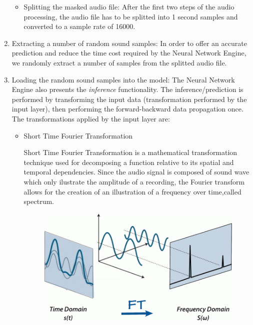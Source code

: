 \begin{enumerate}
\begin{itemize}
			\item Splitting the masked audio file: After the first two steps of the audio processing,
	the audio file has to be splitted into 1 second samples and converted to a sample rate of 16000.
		\end{itemize}

	\item Extracting a number of random sound samples: In order to offer an accurate prediction and reduce the
	time cost required by the Neural Network Engine, we randomly extract a number of samples from the splitted audio
	file.
\item Loading the random sound samples into the model: The Neural Network Engine also presents the \textit{inference}
	functionality. The inference/prediction is performed by transforming the input data (transformation performed
	by the input layer), then performing the forward-backward data propagation once.
	The transformations applied by the input layer are:
	\begin{itemize}

		\item Short Time Fourier Transformation

		Short Time Fourier Transformation is a mathematical transformation technique used for
		decomposing a function relative to its spatial and temporal dependencies. Since the audio signal is
		composed of sound wave which only ilustrate the amplitude of
		a recording, the Fourier transform allows for the creation of an illustration of a frequency
		over time,called spectrum. \cite{ft}

			\begin{figure}
				\centering
				\includegraphics[width = 4.5in]{images/ft.png}
			\centerline{}
			\label{ft}
			\end{figure}



\end{itemize}
\end{enumerate}
